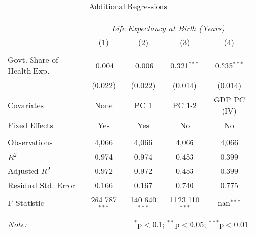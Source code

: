 \begin{table}[!htbp] \centering
  \caption{Additional Regressions \label{additional_regs}}
\begin{tabular}{@{\extracolsep{5pt}}lcccc}
\\[-1.8ex]\hline
\hline \\[-1.8ex]
& \multicolumn{4}{c}{\textit{Life Expectancy at Birth (Years)}} \
\cr \
\\[-1.8ex] & (1) & (2) & (3) & (4) \\
\hline \\[-1.8ex]
 Govt. Share of Health Exp. & -0.004$^{}$ & -0.006$^{}$ & 0.321$^{***}$ & 0.335$^{***}$ \\
  & (0.022) & (0.022) & (0.014) & (0.014) \\
 Covariates & None & PC 1 & PC 1-2 & GDP PC (IV) \\
 Fixed Effects & Yes & Yes & No & No \\
\hline \\[-1.8ex]
 Observations & 4,066 & 4,066 & 4,066 & 4,066 \\
 $R^2$ & 0.974 & 0.974 & 0.453 & 0.399 \\
 Adjusted $R^2$ & 0.972 & 0.972 & 0.453 & 0.399 \\
 Residual Std. Error & 0.166 & 0.167 & 0.740 & 0.775  \\
 F Statistic & 264.787$^{***}$  & 140.640$^{***}$  & 1123.110$^{***}$  & nan$^{***}$  \\
\hline
\hline \\[-1.8ex]
\textit{Note:} & \multicolumn{4}{r}{$^{*}$p$<$0.1; $^{**}$p$<$0.05; $^{***}$p$<$0.01} \\
\end{tabular}
\end{table}